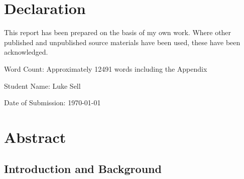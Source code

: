 \documentclass[]{final_report}
\def\studentname{Luke Sell}
\begin{document}
\maketitle

\chapter*{Declaration}

This report has been prepared on the basis of my own work. Where other published and unpublished source materials have been used, these have been acknowledged.

Word Count: Approximately 12491 words including the Appendix

Student Name: \studentname

Date of Submission: \today

\newpage
\tableofcontents{}
\newpage

\chapter*{Abstract}

\section*{Introduction and Background}
\end{document}

